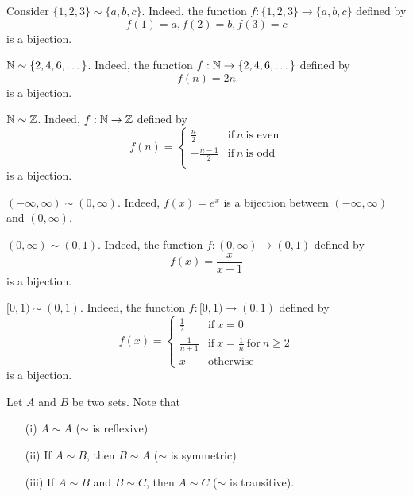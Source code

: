 \documentclass[a4paper]{report}
\begin{document}
\begin{eg}
   Consider \( \{ 1,2,3 \}  \sim \{ a,b,c \}  \). Indeed, the function \( f: \{ 1,2,3 \}  \to \{ a,b,c \}  \) defined by 
   \[ f(1) = a, f(2) = b, f(3) = c  \]
   is a bijection.
\end{eg}

\begin{eg}
    \( \mathbb{N} \sim \{ 2,4,6,\dots \}  \). Indeed, the function \( f: \mathbb{N} \to \{ 2,4,6,\dots \}   \) defined by 
    \[  f(n) = 2n \]
    is a bijection.
\end{eg}

\begin{eg}
    \( \mathbb{N} \sim \mathbb{Z}  \). Indeed, \( f: \mathbb{N} \to \mathbb{Z}  \) defined by
    \[  f(n) = 
    \begin{cases}
        \frac{ n }{ 2 }  &\text{if} \ n \ \text{is even} \\
        -\frac{ n - 1 }{ 2 }  &\text{if} \ n \ \text{is odd} \\
    \end{cases}  \]
    is a bijection.
\end{eg}

\begin{eg}
    \( (-\infty , \infty ) \sim (0,\infty ) \). Indeed, \( f(x) = e^{x}  \) is a bijection between \( (-\infty , \infty ) \) and \( (0,\infty ) \).
\end{eg}

\begin{eg}
    \( (0,\infty ) \sim (0,1) \). Indeed, the function \( f: (0,\infty) \to (0,1) \) defined by 
    \[  f(x) = \frac{ x  }{  x + 1  }  \] is a bijection.
\end{eg}

\begin{eg}
    \( [0,1) \sim (0,1) \). Indeed, the function \( f: [0,1) \to (0,1) \) defined by
    \[  f(x) = 
    \begin{cases}
        \frac{ 1 }{ 2 }  &\text{if} \ x = 0 \\ 
        \frac{ 1 }{ n+1 }  &\text{if} \ x = \frac{ 1 }{ n }  \ \text{for} \ n \geq 2 \\
        x &\text{otherwise}
    \end{cases}  \]
    is a bijection.
\end{eg}

\begin{definition}
    Let \(  A  \) and \( B  \) be two sets. Note that 
    \begin{enumerate}
        \item[(i)] \( A \sim A \) (\( \sim  \) is reflexive) 
        \item[(ii)] If \( A \sim B  \), then \( B \sim A  \) (\( \sim  \) is symmetric) 
        \item[(iii)] If \( A \sim B  \) and \( B \sim C  \), then \( A \sim C  \) (\( \sim  \) is transitive).
    \end{enumerate}
\end{definition}
\end{document}
